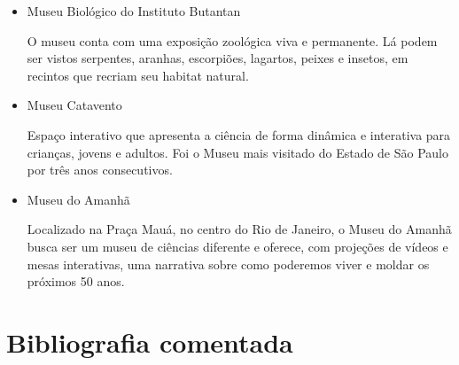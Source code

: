 \documentclass[11pt]{extarticle}
\begin{document}
\begin{itemize}

\item Museu Biológico do Instituto Butantan

O museu conta com uma exposição zoológica viva e permanente. Lá podem ser vistos serpentes, aranhas, escorpiões, lagartos, peixes e insetos, em recintos que recriam seu habitat natural.

\item Museu Catavento

Espaço interativo que apresenta a ciência de forma dinâmica e interativa para crianças, jovens e adultos. Foi o Museu mais visitado do Estado de São Paulo por três anos consecutivos.

\item Museu do Amanhã

Localizado na Praça Mauá, no centro do Rio de Janeiro, o Museu do Amanhã busca ser um museu de ciências diferente e oferece, com projeções de vídeos e mesas interativas, uma narrativa sobre como poderemos viver e moldar os próximos 50 anos. 

\end{itemize}

\section{Bibliografia comentada}
\end{document}
